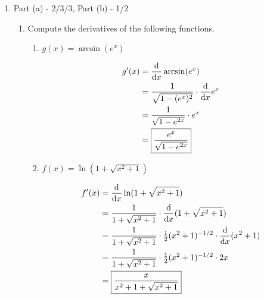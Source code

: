 \documentclass{article}
\begin{document}
\begin{enumerate}
\begin{enumerate}
        
\end{enumerate}

\newpage 


\item 

    \begin{grading}
        Part (a) - 2/3/3, Part (b) - 1/2
    \end{grading}

\begin{enumerate}
    \item  
    \begin{problem}
    Compute the derivatives of the following functions.
    \end{problem}

    \begin{enumerate} 
        
        \item 
        \begin{problem}
        $g(x)=\arcsin(e^x)$
        \end{problem}
        \pspace{\vfill}

        \begin{solution}
            \begin{align*}
                g'(x) &= \diff*{\arcsin(e^x)}{x} \\
                &= \frac{1}{\sqrt{1-(e^x)^2}} \cdot \diff*{e^x}{x} \\
                &= \frac{1}{\sqrt{1-e^{2x}}} \cdot e^x \\
                &= \boxed{\frac{e^x}{\sqrt{1-e^{2x}}}}
            \end{align*}
        \end{solution}

        \item 
        \begin{problem}
        $f(x)=\ln(1+\sqrt{x^2+1})$
        \end{problem}
        \pspace{\vfill}

        \begin{solution}
            \begin{align*}
                f'(x) &= \diff*{\ln(1+\sqrt{x^2+1})}{x} \\
                &= \frac{1}{1+\sqrt{x^2+1}} \cdot \diff*{(1+\sqrt{x^2+1})}{x} \\
                &= \frac{1}{1+\sqrt{x^2+1}} \cdot \tfrac{1}{2}(x^2+1)^{-1/2} \cdot \diff*{(x^2+1)}{x} \\
                &= \frac{1}{1+\sqrt{x^2+1}} \cdot \tfrac{1}{2}(x^2+1)^{-1/2} \cdot 2x \\
                &= \boxed{\frac{x}{x^2+1+\sqrt{x^2+1}}}
            \end{align*}
        \end{solution}
    

\end{enumerate}
\end{enumerate}
\end{enumerate}
\end{document}
